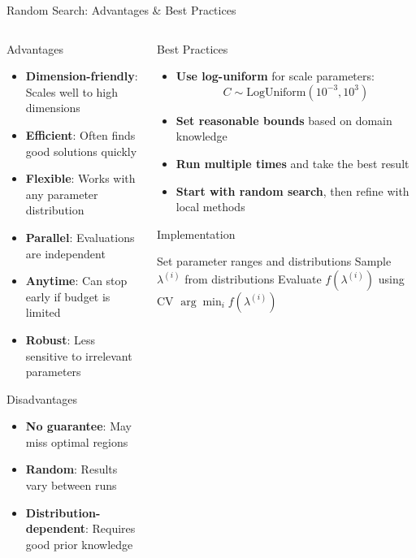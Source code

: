 \documentclass[8pt,aspectratio=1610]{beamer}
\begin{document}
\begin{frame}{Random Search: Advantages \& Best Practices}
\begin{columns}[t]
\begin{column}{0.48\textwidth}
\begin{block}{Advantages}
\begin{itemize}
\setlength{\itemsep}{3pt}
\item \textbf{Dimension-friendly}: Scales well to high dimensions
\item \textbf{Efficient}: Often finds good solutions quickly
\item \textbf{Flexible}: Works with any parameter distribution
\item \textbf{Parallel}: Evaluations are independent
\item \textbf{Anytime}: Can stop early if budget is limited
\item \textbf{Robust}: Less sensitive to irrelevant parameters
\end{itemize}
\end{block}

\begin{block}{Disadvantages}
\begin{itemize}
\setlength{\itemsep}{2pt}
\item \textbf{No guarantee}: May miss optimal regions
\item \textbf{Random}: Results vary between runs
\item \textbf{Distribution-dependent}: Requires good prior knowledge
\end{itemize}
\end{block}
\end{column}

\begin{column}{0.48\textwidth}
\begin{block}{Best Practices}
\begin{itemize}
\setlength{\itemsep}{3pt}
\item \textbf{Use log-uniform} for scale parameters:
$$C \sim \text{LogUniform}(10^{-3}, 10^3)$$
\item \textbf{Set reasonable bounds} based on domain knowledge
\item \textbf{Run multiple times} and take the best result
\item \textbf{Start with random search}, then refine with local methods
\end{itemize}
\end{block}

\begin{block}{Implementation}
\begin{algorithmic}[1]
\STATE Set parameter ranges and distributions
\STATE Sample $\lambda^{(i)}$ from distributions
\STATE Evaluate $f(\lambda^{(i)})$ using CV
\ENDFOR
\RETURN $\arg\min_i f(\lambda^{(i)})$
\end{algorithmic}
\end{block}
\end{column}
\end{columns}


\end{frame}
\end{document}
